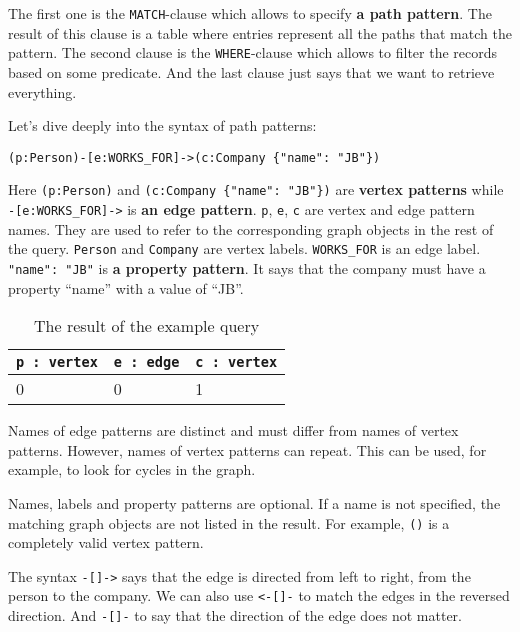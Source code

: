 \documentclass[14pt]{constructor-thesis}
\theoremstyle{definition}
\begin{document}
The first one is the \texttt{MATCH}-clause which allows to specify \textbf{a path pattern}. The result of this clause is a table where entries represent all the paths that match the pattern. The second clause is the \texttt{WHERE}-clause which allows to filter the records based on some predicate. And the last clause just says that we want to retrieve everything.

Let's dive deeply into the syntax of path patterns:
\begin{verbatim}
(p:Person)-[e:WORKS_FOR]->(c:Company {"name": "JB"})
\end{verbatim}

Here \verb+(p:Person)+ and \verb+(c:Company {"name": "JB"})+ are \textbf{vertex patterns} while \verb+-[e:WORKS_FOR]->+ is \textbf{an edge pattern}. \texttt{p}, \texttt{e}, \texttt{c} are vertex and edge pattern names. They are used to refer to the corresponding graph objects in the rest of the query. \texttt{Person} and \texttt{Company} are vertex labels. \texttt{WORKS\_FOR} is an edge label. \texttt{"name": "JB"} is \textbf{a property pattern}. It says that the company must have a property ``name'' with a value of ``JB''.

\begin{table}[b]
  \centering
  
  \begin{tabular}{ |p{3cm}|p{3cm}|p{3cm}|  }
    \hline
    \texttt{p : vertex} & \texttt{e : edge} & \texttt{c : vertex} \\
    \hline
    0 & 0 & 1 \\
    \hline
  \end{tabular}

  \caption{The result of the example query}
  \label{tab:example-query-binding-table}
\end{table}

Names of edge patterns are distinct and must differ from names of vertex patterns. However, names of vertex patterns can repeat. This can be used, for example, to look for cycles in the graph.

Names, labels and property patterns are optional. If a name is not specified, the matching graph objects are not listed in the result. For example, \texttt{()} is a completely valid vertex pattern.

The syntax \texttt{-[]->} says that the edge is directed from left to right, from the person to the company. We can also use \texttt{<-[]-} to match the edges in the reversed direction. And \texttt{-[]-} to say that the direction of the edge does not matter.
\end{document}
